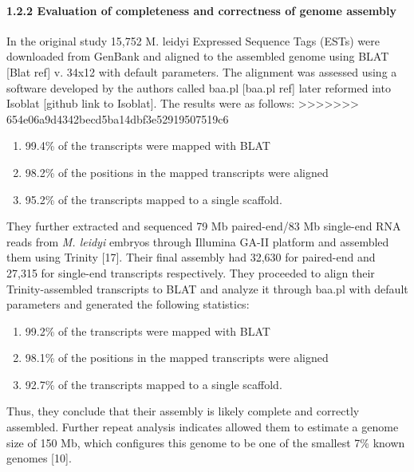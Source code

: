 \documentclass[
]{article}
\providecommand{\tightlist}{%
  \setlength{\itemsep}{0pt}\setlength{\parskip}{0pt}}
\begin{document}
\hypertarget{evaluation-of-completeness-and-correctness-of-genome-assembly-1}{%
\paragraph{1.2.2 Evaluation of completeness and correctness of genome
assembly}\label{evaluation-of-completeness-and-correctness-of-genome-assembly-1}}

In the original study 15,752 M. leidyi Expressed Sequence Tags (ESTs)
were downloaded from GenBank and aligned to the assembled genome using
BLAT {[}Blat ref{]} v. 34x12 with default parameters. The alignment was
assessed using a software developed by the authors called baa.pl
{[}baa.pl ref{]} later reformed into Isoblat {[}github link to
Isoblat{]}. The results were as follows:
\textgreater\textgreater\textgreater\textgreater\textgreater\textgreater\textgreater{}
654e06a9d4342becd5ba14dbf3e52919507519c6

\begin{enumerate}
\def\labelenumi{\arabic{enumi})}
\tightlist
\item
  99.4\% of the transcripts were mapped with BLAT
\item
  98.2\% of the positions in the mapped transcripts were aligned
\item
  95.2\% of the transcripts mapped to a single scaffold.
\end{enumerate}

They further extracted and sequenced 79 Mb paired-end/83 Mb single-end
RNA reads from \emph{M. leidyi} embryos through Illumina GA-II platform
and assembled them using Trinity {[}17{]}. Their final assembly had
32,630 for paired-end and 27,315 for single-end transcripts
respectively. They proceeded to align their Trinity-assembled
transcripts to BLAT and analyze it through baa.pl with default
parameters and generated the following statistics:

\begin{enumerate}
\def\labelenumi{\arabic{enumi})}
\tightlist
\item
  99.2\% of the transcripts were mapped with BLAT
\item
  98.1\% of the positions in the mapped transcripts were aligned
\item
  92.7\% of the transcripts mapped to a single scaffold.
\end{enumerate}

Thus, they conclude that their assembly is likely complete and correctly
assembled. Further repeat analysis indicates allowed them to estimate a
genome size of 150 Mb, which configures this genome to be one of the
smallest 7\% known genomes {[}10{]}.
\end{document}
